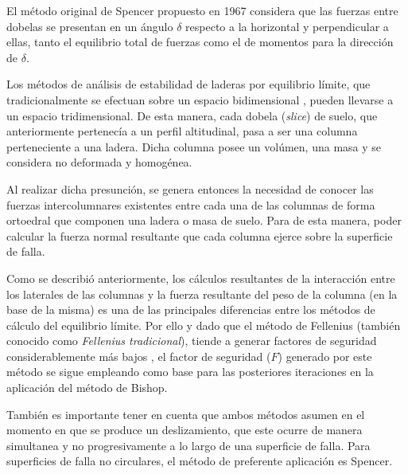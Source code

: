 El m\'etodo original de Spencer propuesto en 1967 considera que las fuerzas entre dobelas se presentan en un \'angulo $\delta$ respecto a la horizontal y perpendicular a ellas, tanto el equilibrio total de fuerzas como el de momentos para la direcci\'on de $\delta$. 

Los m\'etodos de an\'alisis de estabilidad de laderas por equilibrio l\'imite, que tradicionalmente se efectuan sobre un espacio bidimensional , pueden llevarse a un espacio tridimensional. 
De esta manera, cada dobela (\textit{slice}) de suelo, que anteriormente pertenec\'ia a un perfil altitudinal, pasa a ser una columna perteneciente a una ladera. Dicha columna posee un vol\'umen, una masa y se considera no deformada y homog\'enea.

Al realizar dicha presunci\'on, se genera entonces la necesidad de conocer las fuerzas intercolumnares existentes entre cada una de las columnas de forma ortoedral que componen una ladera o masa de suelo. Para de esta manera, poder calcular la fuerza normal resultante que cada columna ejerce sobre la superficie de falla.\cite{reid2015scoops3d}

Como se describi\'o anteriormente, los c\'alculos resultantes de la interacci\'on entre los laterales de las columnas y la fuerza resultante del peso de la columna (en la base de la misma) es una de las principales diferencias entre los m\'etodos de c\'alculo del equilibrio l\'imite. Por ello y dado que el m\'etodo de Fellenius (tambi\'en conocido como  \emph{Fellenius tradicional}), tiende a generar factores de seguridad considerablemente m\'as bajos \cite{traditional}, el factor de seguridad (\(F\)) generado por este m\'etodo se sigue empleando como base para las posteriores iteraciones en la aplicaci\'on del m\'etodo de Bishop. \cite{fredlund1977comparison}

Tambi\'en es importante tener en cuenta que ambos m\'etodos asumen en el momento en que se produce un deslizamiento, que este ocurre de manera simultanea y no progresivamente a lo largo de una superficie de falla.
Para superficies de falla no circulares, el m\'etodo de preferente aplicaci\'on es Spencer.  \cite{huangS} 


